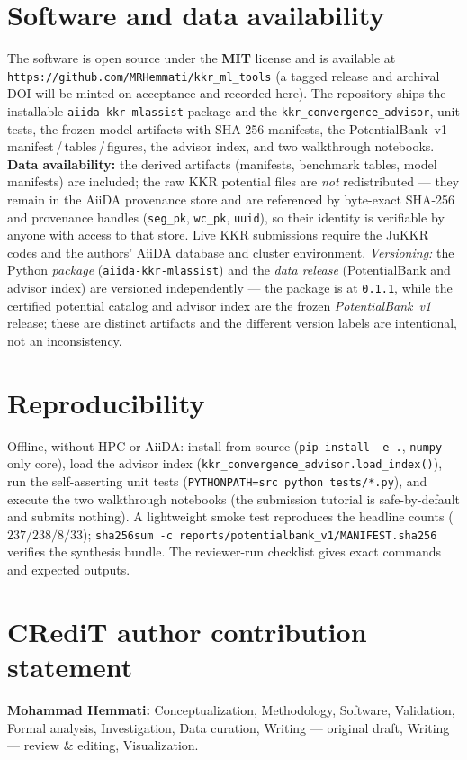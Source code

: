 \documentclass[11pt]{article}
\newcommand{\code}[1]{\texttt{#1}}
\begin{document}
\section{Software and data availability}
\label{sec:availability}
The software is open source under the \textbf{MIT} license and is available at
\texttt{https://github.com/MRHemmati/kkr\_ml\_tools} (a tagged release and archival DOI will be minted on
acceptance and recorded here). The repository ships the installable \code{aiida-kkr-mlassist} package and the
\code{kkr\_convergence\_advisor}, unit tests, the frozen model artifacts with SHA-256 manifests, the
PotentialBank~v1 manifest\,/\,tables\,/\,figures, the advisor index, and two walkthrough notebooks. \textbf{Data
availability:} the derived artifacts (manifests, benchmark tables, model manifests) are included; the raw KKR
potential files are \emph{not} redistributed --- they remain in the AiiDA provenance store and are referenced by
byte-exact SHA-256 and provenance handles (\code{seg\_pk}, \code{wc\_pk}, \code{uuid}), so their identity is
verifiable by anyone with access to that store. Live KKR submissions require the JuKKR codes and the authors'
AiiDA database and cluster environment.
\emph{Versioning:} the Python \emph{package} (\code{aiida-kkr-mlassist}) and the \emph{data release}
(PotentialBank and advisor index) are versioned independently --- the package is at \code{0.1.1}, while the
certified potential catalog and advisor index are the frozen \emph{PotentialBank~v1} release; these are distinct
artifacts and the different version labels are intentional, not an inconsistency.

\section{Reproducibility}
\label{sec:reproducibility}
Offline, without HPC or AiiDA: install from source (\code{pip install -e .}, \code{numpy}-only core), load the
advisor index (\code{kkr\_convergence\_advisor.load\_index()}), run the self-asserting unit tests
(\code{PYTHONPATH=src python tests/*.py}), and execute the two walkthrough notebooks (the submission tutorial is
safe-by-default and submits nothing). A lightweight smoke test reproduces the headline counts
($237/238/8/33$); \code{sha256sum -c reports/potentialbank\_v1/MANIFEST.sha256} verifies the synthesis bundle.
The reviewer-run checklist gives exact commands and expected outputs.

\section*{CRediT author contribution statement}
\textbf{Mohammad Hemmati:} Conceptualization, Methodology, Software, Validation, Formal analysis,
Investigation, Data curation, Writing --- original draft, Writing --- review \& editing, Visualization.
\end{document}
